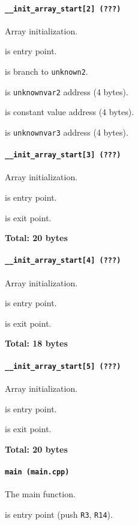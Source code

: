 \paragraph{\texttt{\_\_init\_array\_start[2] (???)}} Array initialization.

 is entry point.

 is branch to \texttt{unknown2}.

 is \texttt{unknownvar2} address (4 bytes).

 is constant value address (4 bytes).

 is \texttt{unknownvar3} address (4 bytes).

\paragraph{\texttt{\_\_init\_array\_start[3] (???)}} Array initialization.

 is entry point.

 is exit point.

\textbf{Total: 20 bytes}

\paragraph{\texttt{\_\_init\_array\_start[4] (???)}} Array initialization.

 is entry point.

 is exit point.

\textbf{Total: 18 bytes}

\paragraph{\texttt{\_\_init\_array\_start[5] (???)}} Array initialization.

 is entry point.

 is exit point.

\textbf{Total: 20 bytes}

\paragraph{\texttt{main (main.cpp)}} The main function.

 is entry point (push \texttt{R3}, \texttt{R14}).

